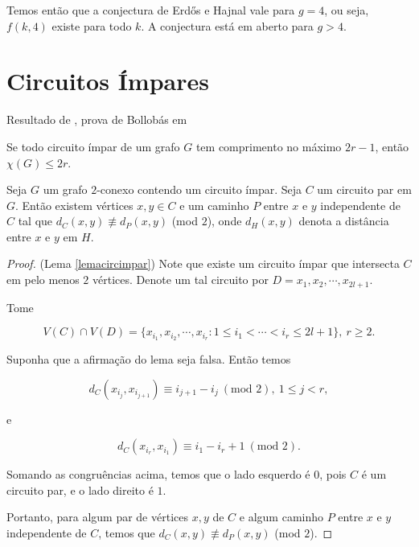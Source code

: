 Temos então que a conjectura de Erd\H{o}s e Hajnal vale para $g=4$, ou seja, $f(k,4)$ existe para todo $k$. A conjectura está em aberto para $g > 4$.

\section{Circuitos Ímpares}

Resultado de \cite{erdHos1966chromatic}, prova de Bollobás em \cite{bollobas2004extremal}

\begin{teorema}\label{teocircimpar}
Se todo circuito ímpar de um grafo $G$ tem comprimento no máximo $2r-1$, então $\chi(G) \leq 2r$.
\end{teorema}

\begin{lema}\label{lemacircimpar}
Seja $G$ um grafo $2$-conexo contendo um circuito ímpar. Seja $C$ um circuito par em $G$. Então existem vértices $x,y \in C$ e um caminho $P$ entre $x$ e $y$ independente de $C$ tal que $d_C(x,y) \not\equiv d_P(x,y)$ (mod $2$), onde $d_H(x,y)$ denota a distância entre $x$ e $y$ em $H$.
\end{lema}

\begin{proof}(Lema \ref{lemacircimpar})
Note que existe um circuito ímpar que intersecta $C$ em pelo menos $2$ vértices. Denote um tal circuito por $D = x_1, x_2, \cdots, x_{2l+1}$.

Tome

\[V(C) \cap V(D) = \{x_{i_1}, x_{i_2}, \cdots, x_{i_r} : 1\leq i_1 < \cdots < i_r \leq 2l+1 \},\ r\geq 2.\]

Suponha que a afirmação do lema seja falsa. Então temos

\[d_C(x_{i_j}, x_{i_{j+1}}) \equiv i_{j+1} - i_j\ (\text{mod } 2),\ 1\leq j< r,\]

e

\[d_C(x_{i_r}, x_{i_1}) \equiv i_1 - i_r + 1\ (\text{mod } 2).\]

Somando as congruências acima, temos que o lado esquerdo é $0$, pois $C$ é um circuito par, e o lado direito é $1$. 

Portanto, para algum par de vértices $x,y$ de $C$ e algum caminho $P$ entre $x$ e $y$ independente de $C$, temos que $d_C(x,y) \not\equiv d_P(x,y)$ (mod $2$).
\end{proof}

